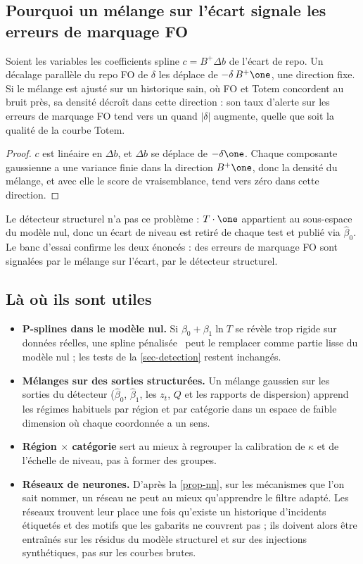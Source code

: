 \subsection{Pourquoi un mélange sur l'écart signale les erreurs de marquage FO}
\begin{proposition}\label{prop-gmm-fo}
Soient les variables les coefficients spline $c=B^+\Delta b$ de l'écart de repo. Un décalage parallèle du repo FO de
$\delta$ les déplace de $-\delta\,B^+\one$, une direction fixe. Si le mélange est ajusté sur un historique sain, où FO et Totem
concordent au bruit près, sa densité décroît dans cette direction : son taux d'alerte sur les erreurs de marquage FO tend
vers un quand $|\delta|$ augmente, quelle que soit la qualité de la courbe Totem.
\end{proposition}
\begin{proof}
$c$ est linéaire en $\Delta b$, et $\Delta b$ se déplace de $-\delta\one$. Chaque composante gaussienne a une variance finie dans
la direction $B^+\one$, donc la densité du mélange, et avec elle le score de vraisemblance, tend vers zéro dans cette
direction.
\end{proof}
Le détecteur structurel n'a pas ce problème : $T\cdot\one$ appartient au sous-espace du modèle nul, donc un écart de niveau
est retiré de chaque test et publié via $\hat\beta_0$. Le banc d'essai confirme les deux énoncés : \vFoGmmDiff{} des
erreurs de marquage FO sont signalées par le mélange sur l'écart, \vFoStruct{} par le détecteur structurel.

\subsection{Là où ils sont utiles}
\begin{itemize}
\item \textbf{P-splines dans le modèle nul.} Si $\beta_0+\beta_1\ln T$ se révèle trop rigide sur données réelles, une
spline pénalisée~\cite{eilers1996} peut le remplacer comme partie lisse du modèle nul ; les tests de la
\cref{sec-detection} restent inchangés.
\item \textbf{Mélanges sur des sorties structurées.} Un mélange gaussien sur les sorties du détecteur ($\hat\beta_0$, $\hat\beta_1$,
les $z_t$, $Q$ et les rapports de dispersion) apprend les régimes habituels par région et par catégorie
dans un espace de faible dimension où chaque coordonnée a un sens.
\item \textbf{Région $\times$ catégorie} sert au mieux à regrouper la calibration de $\kappa$ et de l'échelle de niveau,
pas à former des groupes.
\item \textbf{Réseaux de neurones.} D'après la \cref{prop-nn}, sur les mécanismes que l'on sait nommer, un réseau ne peut
au mieux qu'apprendre le filtre adapté. Les réseaux trouvent leur place une fois qu'existe un historique d'incidents
étiquetés et des motifs que les gabarits ne couvrent pas ; ils doivent alors être entraînés sur les résidus du modèle
structurel et sur des injections synthétiques, pas sur les courbes brutes.
\end{itemize}
